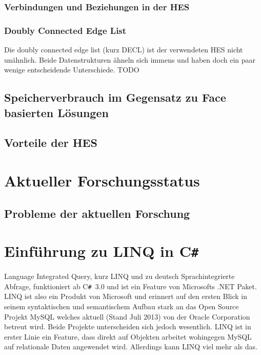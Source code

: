 \documentclass[pagesize, paper=a4, fontsize=12pt,titlepage=true, headings=small, headnosepline, abstractoff, liststotoc, nochapterprefix, plainheadsepline]{scrreprt}
\newcommand{\CS}{C\texttt{\#}}
\newcommand{\CSS}{C\texttt{\# }}
\begin{document}
			\subsubsection {Verbindungen und Beziehungen in der HES}
			\subsubsection {Doubly Connected Edge List}
			Die doubly connected edge list (kurz DECL) ist der verwendeten HES nicht unähnlich. Beide Datenstrukturen ähneln sich immens und haben doch ein paar wenige entscheidende Unterschiede. TODO %
		\subsection {Speicherverbrauch im Gegensatz zu Face basierten Lösungen}
		\subsection {Vorteile der HES}
	\section {Aktueller Forschungsstatus}
		\subsection {Probleme der aktuellen Forschung}
	\section {Einführung zu LINQ in \CS}
		Language Integrated Query, kurz LINQ und zu deutsch Sprachintegrierte Abfrage, funktioniert ab \CSS 3.0 und ist ein Feature von Microsofts .NET Paket. LINQ ist also ein Produkt von Microsoft und erinnert auf den ersten Blick in seinem syntaktischen und semantischem Aufbau stark an das Open Source Projekt MySQL welches aktuell (Stand Juli 2013) von der Oracle Corporation betreut wird. Beide Projekte unterscheiden sich jedoch wesentlich. LINQ ist in erster Linie ein Feature, dass direkt auf Objekten arbeitet wohingegen MySQL auf relationale Daten angewendet wird. Allerdings kann LINQ viel mehr als das.
\end{document}
